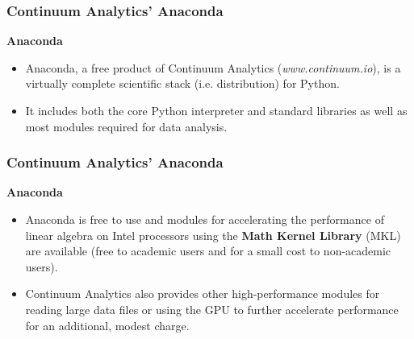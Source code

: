\documentclass[MASTER.tex]{subfiles}
\begin{document}
\begin{frame}
\frametitle{Continuum Analytics’ Anaconda}
\Large
\textbf{Anaconda}
\begin{itemize}
\item Anaconda, a free product of Continuum Analytics (\textit{www.continuum.io}), is a virtually complete scientific
stack (i.e. distribution) for Python. 
\item It includes both the core Python interpreter and standard libraries as well as most
modules required for data analysis. 

\end{itemize}
\end{frame}
\begin{frame}
\frametitle{Continuum Analytics’ Anaconda}
\Large
\textbf{Anaconda}
	\begin{itemize}
\item Anaconda is free to use and modules for accelerating the performance
of linear algebra on Intel processors using the \textbf{Math Kernel Library} (MKL) are available (free to
academic users and for a small cost to non-academic users). 
\item Continuum Analytics also provides other
high-performance modules for reading large data files or using the GPU to further accelerate performance
for an additional, modest charge. 
	\end{itemize}

\end{frame}
\end{document}
